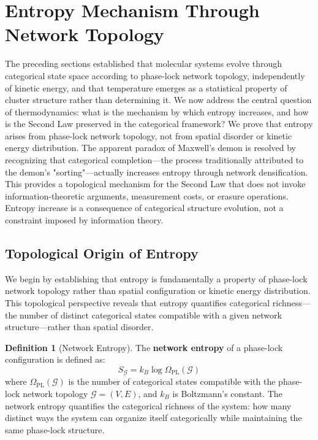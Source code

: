 \documentclass[12pt,a4paper]{article}
\theoremstyle{definition}
\newtheorem{definition}[theorem]{Definition}
\theoremstyle{remark}
\newcommand{\phaselockgraph}{\mathcal{G}}
\begin{document}
\section{Entropy Mechanism Through Network Topology}
\label{sec:entropy}

The preceding sections established that molecular systems evolve through categorical state space according to phase-lock network topology, independently of kinetic energy, and that temperature emerges as a statistical property of cluster structure rather than determining it. We now address the central question of thermodynamics: what is the mechanism by which entropy increases, and how is the Second Law preserved in the categorical framework? We prove that entropy arises from phase-lock network topology, not from spatial disorder or kinetic energy distribution. The apparent paradox of Maxwell's demon is resolved by recognizing that categorical completion—the process traditionally attributed to the demon's "sorting"—actually increases entropy through network densification. This provides a topological mechanism for the Second Law that does not invoke information-theoretic arguments, measurement costs, or erasure operations. Entropy increase is a consequence of categorical structure evolution, not a constraint imposed by information theory.

\subsection{Topological Origin of Entropy}

We begin by establishing that entropy is fundamentally a property of phase-lock network topology rather than spatial configuration or kinetic energy distribution. This topological perspective reveals that entropy quantifies categorical richness—the number of distinct categorical states compatible with a given network structure—rather than spatial disorder.

\begin{definition}[Network Entropy]
\label{def:network_entropy}
The \textbf{network entropy} of a phase-lock configuration is defined as:
\begin{equation}
S_{\phaselockgraph} = k_B \log \Omega_{\text{PL}}(\phaselockgraph)
\label{eq:network_entropy}
\end{equation}
where $\Omega_{\text{PL}}(\phaselockgraph)$ is the number of categorical states compatible with the phase-lock network topology $\phaselockgraph = (V, E)$, and $k_B$ is Boltzmann's constant. The network entropy quantifies the categorical richness of the system: how many distinct ways the system can organize itself categorically while maintaining the same phase-lock structure.
\end{definition}
\end{document}
